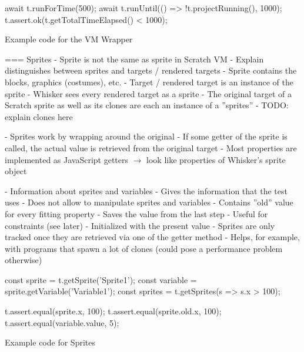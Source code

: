 \begin{listing}[ht]
    \centering
    \begin{javascriptcode}
        await t.runForTime(500);
        await t.runUntil(() => !t.projectRunning(), 1000);
        t.assert.ok(t.getTotalTimeElapsed() < 1000);
    \end{javascriptcode}
    \vspace{-\bigskipamount}
    \caption{Example code for the VM Wrapper}
    \label{fig:example_code_for_the_vm_wrapper}
\end{listing}

=== Sprites
- Sprite is not the same as sprite in Scratch VM
    - Explain distinguishes between sprites and targets / rendered targets
    - Sprite contains the blocks, graphics (costumes), etc.
    - Target / rendered target is an instance of the sprite
    - Whisker sees every rendered target as a sprite
    - The original target of a Scratch sprite as well as its clones are each an instance of a ''sprites''
    - TODO: explain clones here

- Sprites work by wrapping around the original
- If some getter of the sprite is called, the actual value is retrieved from the original target
- Most properties are implemented as JavaScript getters $\rightarrow$ look like properties of Whisker's sprite object

- Information about sprites and variables
- Gives the information that the test uses
- Does not allow to manipulate sprites and variables
- Contains ''old'' value for every fitting property
    - Saves the value from the last step
    - Useful for constraints (see later)
    - Initialized with the present value
- Sprites are only tracked once they are retrieved via one of the getter method
- Helps, for example, with programs that spawn a lot of clones (could pose a performance problem otherwise)


\begin{listing}[ht]
    \centering
    \begin{javascriptcode}
        const sprite = t.getSprite('Sprite1');
        const variable = sprite.getVariable('Variable1');
        const sprites = t.getSprites(s => s.x > 100);

        t.assert.equal(sprite.x, 100);
        t.assert.equal(sprite.old.x, 100);
        t.assert.equal(variable.value, 5);
    \end{javascriptcode}
    \vspace{-\bigskipamount}
    \caption{Example code for Sprites}
    \label{fig:example_code_for_sprites}
\end{listing}

